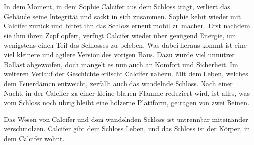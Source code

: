 In dem Moment, in dem Sophie Calcifer aus dem Schloss trägt, verliert das Gebäude seine Integrität und sackt in sich zusammen. Sophie kehrt wieder mit Calcifer zurück und bittet ihn das Schloss erneut mobil zu machen. Erst nachdem sie ihm ihren Zopf opfert, verfügt Calcifer wieder über genügend Energie, um wenigstens einen Teil des Schlosses zu beleben. Was dabei heraus kommt ist eine viel kleinere und agilere Version des vorigen Baus. Dazu wurde viel unnützer Ballast abgeworfen, doch mangelt es nun auch an Komfort und Sicherheit. 
Im weiteren Verlauf der Geschichte erlischt Calcifer nahezu. Mit dem Leben, welches dem Feuerdämon entweicht, zerfällt auch das wandelnde Schloss. Nach einer Nacht, in der Calcifer zu einer kleine blauen Flamme reduziert wird, ist alles, was vom Schloss noch übrig bleibt eine hölzerne Plattform, getragen von zwei Beinen. 

Das Wesen von Calcifer und dem wandelnden Schloss ist untrennbar miteinander verschmolzen. Calcifer gibt dem Schloss Leben, und das Schloss ist der Körper, in dem Calcifer wohnt. 